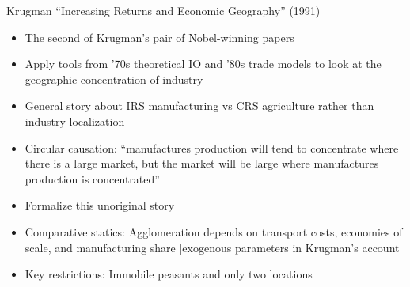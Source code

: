 \documentclass[11pt,notes=hide,aspectratio=169]{beamer}
\begin{document}
\begin{frame}{Krugman ``Increasing Returns and Economic Geography'' (1991)}
\begin{itemize}
	\item The second of Krugman's pair of Nobel-winning papers
	\item Apply tools from '70s theoretical IO and '80s trade models to look at the geographic concentration of industry
	\item General story about IRS manufacturing vs CRS agriculture rather than industry localization
	\item Circular causation: ``manufactures production will tend to concentrate where there is a large market, but the market will be large where manufactures production is concentrated''
	\item Formalize this unoriginal story
	\item Comparative statics: Agglomeration depends on transport costs, economies of scale, and manufacturing share [exogenous parameters in Krugman's account]
	\item Key restrictions: Immobile peasants and only two locations
\end{itemize}
\end{frame}
\end{document}
